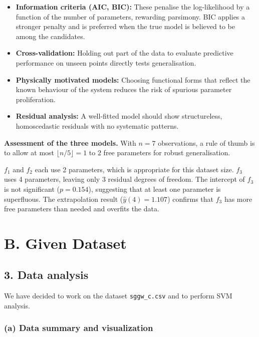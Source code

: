\documentclass{article}
\begin{document}
\begin{itemize}
    \item \textbf{Information criteria (AIC, BIC):} These penalise the log-likelihood by a function of the number of parameters, rewarding parsimony. BIC applies a stronger penalty and is preferred when the true model is believed to be among the candidates.
    \item \textbf{Cross-validation:} Holding out part of the data to evaluate predictive performance on unseen points directly tests generalisation.
    \item \textbf{Physically motivated models:} Choosing functional forms that reflect the known behaviour of the system reduces the risk of spurious parameter proliferation.
    \item \textbf{Residual analysis:} A well-fitted model should show structureless, homoscedastic residuals with no systematic patterns.
\end{itemize}

\noindent\textbf{Assessment of the three models.} With $n = 7$ observations, a rule of thumb is to allow at most $\lfloor n/5 \rfloor = 1$ to $2$ free parameters for robust generalisation.

$f_1$ and $f_2$ each use 2 parameters, which is appropriate for this dataset size. $f_3$ uses 4 parameters, leaving only 3 residual degrees of freedom. The intercept of $f_3$ is not significant ($p = 0.154$), suggesting that at least one parameter is superfluous. The extrapolation result ($\hat{y}(4) = 1.107$) confirms that $f_3$ has more free parameters than needed and overfits the data.



\newpage

\section*{B. Given Dataset}

\subsection*{3. Data analysis}

We have decided to work on the dataset \texttt{sggw\_c.csv} and to perform SVM analysis.

\subsubsection*{(a) Data summary and visualization} 
\end{document}
